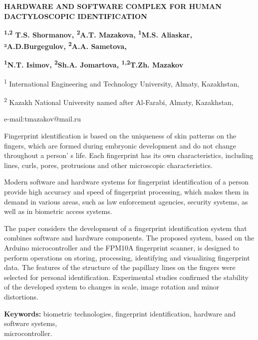 \begin{articleheader}
{\bfseries HARDWARE AND SOFTWARE COMPLEX FOR HUMAN DACTYLOSCOPIC
IDENTIFICATION}

{\bfseries \textsuperscript{1,2} T.S. Shormanov, \textsuperscript{2}A.T.
Mazakova, \textsuperscript{1}M.S. Aliaskar, ²A.D.Burgegulov,
\textsuperscript{2}A.A. Sametova,}

{\bfseries \textsuperscript{1}N.T. Isimov, \textsuperscript{2}Sh.A.
Jomartova, \textsuperscript{1,2}T.Zh. Mazakov\textsuperscript{\envelope }}
\end{articleheader}

\begin{affiliation}
\textsuperscript{1} International Engineering and Technology University,
Almaty, Kazakhstan,

\textsuperscript{2} Kazakh National University named after Al-Farabi,
Almaty, Kazakhstan,

e-mail:tmazakov@mail.ru
\end{affiliation}

Fingerprint identification is based on the uniqueness of skin patterns
on the fingers, which are formed during embryonic development and do not
change throughout a person' s life. Each fingerprint has
its own characteristics, including lines, curls, pores, protrusions and
other microscopic characteristics.

Modern software and hardware systems for fingerprint identification of a
person provide high accuracy and speed of fingerprint processing, which
makes them in demand in various areas, such as law enforcement agencies,
security systems, as well as in biometric access systems.

The paper considers the development of a fingerprint identification
system that combines software and hardware components. The proposed
system, based on the Arduino microcontroller and the FPM10A fingerprint
scanner, is designed to perform operations on storing, processing,
identifying and visualizing fingerprint data. The features of the
structure of the papillary lines on the fingers were selected for
personal identification. Experimental studies confirmed the stability of
the developed system to changes in scale, image rotation and minor
distortions.

{\bfseries Keywords:} biometric technologies, fingerprint identification,
hardware and software systems, \\microcontroller.

